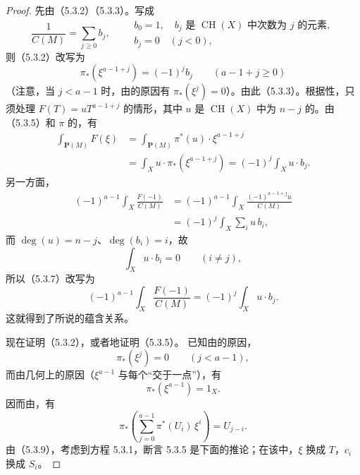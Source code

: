 \begin{proof}
先由（5.3.2）（5.3.3）。写成
\[
\frac1{C(M)}=\sum_{j\geq0}b_j,
\qquad
\begin{gathered}
b_0=1,\quad b_j\text{ 是 }\operatorname{CH}(X)\text{ 中次数为 }j\text{ 的元素},\\
b_j=0\quad(j<0),
\end{gathered}
\tag{5.3.4}
\]
则（5.3.2）改写为
\[
\pi_*(\xi^{a-1+j})=(-1)^jb_j
\qquad(a-1+j\geq0)
\tag{5.3.5}
\]
（注意，当 $j<a-1$ 时，由的原因有 $\pi_*(\xi^j)=0$）。由此（5.3.3）。根据性，只须处理 $F(T)=uT^{a-1+j}$ 的情形，其中 $u$ 是 $\operatorname{CH}(X)$ 中为 $n-j$ 的。由（5.3.5）和 $\pi$ 的，有
\[
\begin{aligned}
\int_{\mathbf P(M)}F(\xi)
&=\int_{\mathbf P(M)}\pi^*(u)\cdot\xi^{a-1+j}\\
&=\int_Xu\cdot\pi_*(\xi^{a-1+j})
=(-1)^j\int_Xu\cdot b_j.
\end{aligned}
\tag{5.3.6}
\]
另一方面，
\[
\begin{aligned}
(-1)^{a-1}\int_X\frac{F(-1)}{C(M)}
&=(-1)^{a-1}\int_X\frac{(-1)^{a-1+j}u}{C(M)}\\
&=(-1)^j\int_X\sum_i u\,b_i,
\end{aligned}
\tag{5.3.7}
\]
而 $\deg(u)=n-j$、$\deg(b_i)=i$，故
\[
\int_Xu\cdot b_i=0\qquad(i\ne j),
\]
所以（5.3.7）改写为
\[
(-1)^{a-1}\int_X\frac{F(-1)}{C(M)}
=(-1)^j\int_Xu\cdot b_j.
\tag{5.3.8}
\]
这就得到了所说的蕴含关系。

现在证明（5.3.2），或者地证明（5.3.5）。
已知由的原因，
\[
\pi_*(\xi^j)=0\qquad(j<a-1),
\]
而由几何上的原因（$\xi^{a-1}$ 与每个“交于一点”），有
\[
\pi_*(\xi^{a-1})=1_X.
\]
因而由，有
\[
\pi_*\left(\sum_{j=0}^{a-1}\pi^*(U_i)\,\xi^i\right)=U_{j-i}.
\tag{5.3.9}
\]
由（5.3.9），考虑到方程 5.3.1，断言 5.3.5 是下面的推论；在该中，$\xi$ 换成 $T$，$c_i$ 换成 $S_i$。
\end{proof}

